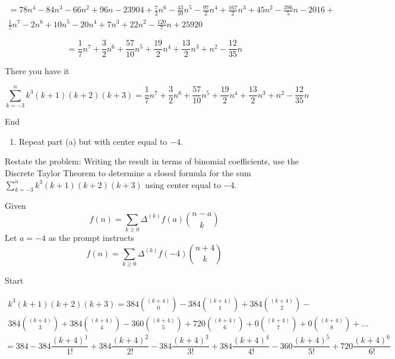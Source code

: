 \documentclass[10pt, AMS Euler]{article}
\newcommand{\ds}{\displaystyle}
\begin{document}
\begin{enumerate}[resume]
                \begin{multline*}
                    = 78n^4-84n^3-66n^2+96n-23904 + \frac{7}{2}n^6-\frac{43}{10}n^5-\frac{97}{2}n^4+\frac{167}{2}n^3+45n^2-\frac{396}{5}n-2016 + \\ \frac{1}{7}n^7-2n^6+10n^5-20n^4+7n^3+22n^2-\frac{120}{7}n+25920
                \end{multline*}

                $$=\frac{1}{7}n^7+\frac{3}{2}n^6+\frac{57}{10}n^5+\frac{19}{2}n^4+\frac{13}{2}n^3+n^2-\frac{12}{35}n$$

                There you have it

                $$\sum_{k = -3}^n k^3(k+1)(k+2)(k+3)=\frac{1}{7}n^7+\frac{3}{2}n^6+\frac{57}{10}n^5+\frac{19}{2}n^4+\frac{13}{2}n^3+n^2-\frac{12}{35}n$$

                End
    
            \newpage
            \begin{enumerate}[resume]
            \item Repeat part (a) but with center equal to $-4$. 
            \end{enumerate}

                Restate the problem: 
                Writing the result in terms of binomial coefficients, use the Discrete Taylor Theorem to determine a closed formula for the sum $\sum_{k = -3}^n k^3(k+1)(k+2)(k+3)$ using center equal to $-4$.

                Given
                $$f(n)=\sum_{k \geq 0}\Delta^{(k)}f(a)\ds\binom{n-a}{k}$$
                Let $a=-4$ as the prompt instructs
                $$f(n)=\sum_{k \geq 0}\Delta^{(k)}f(-4)\ds\binom{n+4}{k}$$

                Start

                \begin{multline*}
                    k^3(k+1)(k+2)(k+3) = 384\ds\binom{(k+4)}{0} -384\ds\binom{(k+4)}{1} + 384\ds\binom{(k+4)}{2} - \\ 384\ds\binom{(k+4)}{3} + 384\ds\binom{(k+4)}{4} -360\ds\binom{(k+4)}{5} + 720\ds\binom{(k+4)}{6} + 0\ds\binom{(k+4)}{7} + 0\ds\binom{(k+4)}{8} + ...
                \end{multline*}
                $$= 384 -384\frac{(k+4)^{\underline{1}}}{1!} + 384\frac{(k+4)^{\underline{2}}}{2!} -384\frac{(k+4)^{\underline{3}}}{3!} + 384\frac{(k+4)^{\underline{4}}}{4!} -360\frac{(k+4)^{\underline{5}}}{5!} + 720\frac{(k+4)^{\underline{6}}}{6!}$$
                

\end{enumerate}
\end{document}
